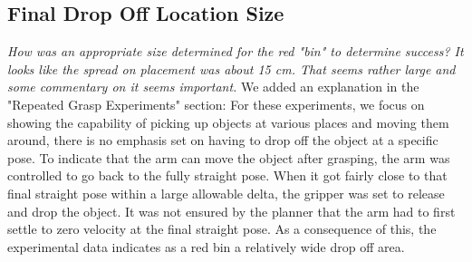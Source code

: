 \documentclass[letterpaper, 10 pt, twocolumn, conference]{article}
\begin{document}
\subsection{Final Drop Off Location Size}
\textit{How was an appropriate size determined for the red "bin" to determine success? It looks like the spread on placement was about 15 cm. That seems rather large and some commentary on it seems important.}
%
We added an explanation in the "Repeated Grasp Experiments" section: For these experiments, we focus on showing the capability of picking up objects at various places and moving them around, there is no emphasis set on having to drop off the object at a specific pose. To indicate that the arm can move the object after grasping, the arm was controlled to go back to the fully straight pose. When it got fairly close to that final straight pose within a large allowable delta, the gripper was set to release and drop the object. It was not ensured by the planner that the arm had to first settle to zero velocity at the final straight pose. As a consequence of this, the experimental data indicates as a red bin a relatively wide drop off area. 
%
\end{document}
